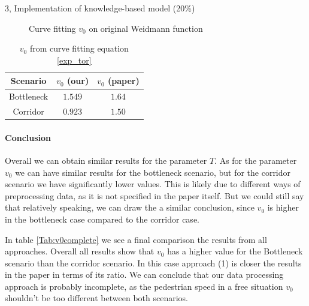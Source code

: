 \begin{task}{3, Implementation of knowledge-based model (20\%)}
\begin{figure}[H]
\centering
{}
\caption{Curve fitting $v_0$ on original Weidmann function}
\label{fig:cv_pap}
\end{figure}

\begin{table}[H]
\centering
\begin{tabular}{ |c|c|c| }
\hline
Scenario & $v_0$ (our) & $v_0$ (paper)\\
\hline
Bottleneck & $1.549$ & $1.64$\\
\hline
Corridor & $0.923$ & $1.50$\\
\hline
\end{tabular}
\caption{$v_0$ from curve fitting equation \ref{exp_tor}}
\label{Tab:v0cv1}
\end{table}

\paragraph{Conclusion}
Overall we can obtain similar results for the parameter $T$. As for the parameter $v_0$ we can have similar results for the bottleneck scenario, but for the corridor scenario we have significantly lower values. This is likely due to different ways of preprocessing data, as it is not specified in the paper itself. But we could still say that relatively speaking, we can draw the a similar conclusion, since $v_0$ is higher in the bottleneck case compared to the corridor case.

In table \ref{Tab:v0complete} we see a final comparison the results from all approaches. Overall all results show that $v_0$ has a higher value for the Bottleneck scenario than the corridor scenario. In this case approach (1) is closer the results in the paper in terms of its ratio. We can conclude that our data processing approach is probably incomplete, as the pedestrian speed in a free situation $v_0$ shouldn't be too different between both scenarios.


\end{task}
